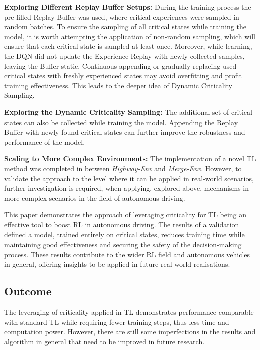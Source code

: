 \textbf{Exploring Different Replay Buffer Setups:} During the training process the pre-filled Replay Buffer was used, where critical experiences were sampled in random batches. To ensure the sampling of all critical states while training the model, it is worth attempting the application of non-random sampling, which will ensure that each critical state is sampled at least once. Moreover, while learning, the DQN did not update the Experience Replay with newly collected samples, leaving the Buffer static. Continuous appending or gradually replacing used critical states with freshly experienced states may avoid overfitting and profit training effectiveness. This leads to the deeper idea of Dynamic Criticality Sampling.

\textbf{Exploring the Dynamic Criticality Sampling:} The additional set of critical states can also be collected while training the model. Appending the Replay Buffer with newly found critical states can further improve the robustness and performance of the model.

\textbf{Scaling to More Complex Environments:} The implementation of a novel TL method was completed in between \emph{Highway-Env} and \emph{Merge-Env}. However, to validate the approach to the level where it can be applied in real-world scenarios, further investigation is required, when applying, explored above, mechanisms in more complex scenarios in the field of autonomous driving.

This paper demonstrates the approach of leveraging criticality for TL being an effective tool to boost RL in autonomous driving. The results of a validation defined a model, trained entirely on critical states, reduces training time while maintaining good effectiveness and securing the safety of the decision-making process. These results contribute to the wider RL field and autonomous vehicles in general, offering insights to be applied in future real-world realisations.

\subsection{Outcome}\label{sec:outcome}

The leveraging of criticality applied in TL demonstrates performance comparable with standard TL while requiring fewer training steps, thus less time and computation power. However, there are still some imperfections in the results and algorithm in general that need to be improved in future research.


